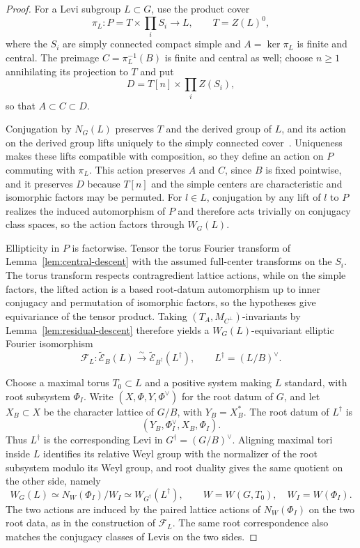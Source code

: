 \documentclass[11pt,a4paper,reqno]{amsart}
\theoremstyle{plain}
\theoremstyle{definition}
\theoremstyle{remark}
\numberwithin{equation}{section}
\newcommand{\wtE}{\widetilde{\mathcal E}}
\begin{document}
\begin{proof}
For a Levi subgroup $L\subset G$, use the product cover
\[
\pi_L\colon P=T\times\prod_i S_i\longrightarrow L,
\qquad T=Z(L)^0,
\]
where the $S_i$ are simply connected compact simple and $A=\ker\pi_L$ is finite and central. The preimage $C=\pi_L^{-1}(B)$ is finite and central as well; choose $n\ge1$ annihilating its projection to $T$ and put
\[
D=T[n]\times\prod_i Z(S_i),
\]
so that $A\subset C\subset D$.

Conjugation by $N_G(L)$ preserves $T$ and the derived group of $L$, and its action on the derived group lifts uniquely to the simply connected cover~\cite[16.10 and~16.21]{Milne}. Uniqueness makes these lifts compatible with composition, so they define an action on $P$ commuting with $\pi_L$. This action preserves $A$ and $C$, since $B$ is fixed pointwise, and it preserves $D$ because $T[n]$ and the simple centers are characteristic and isomorphic factors may be permuted. For $l\in L$, conjugation by any lift of $l$ to $P$ realizes the induced automorphism of $P$ and therefore acts trivially on conjugacy class spaces, so the action factors through $W_G(L)$.

Ellipticity in $P$ is factorwise. Tensor the torus Fourier transform of Lemma~\ref{lem:central-descent} with the assumed full-center transforms on the $S_i$. The torus transform respects contragredient lattice actions, while on the simple factors, the lifted action is a based root-datum automorphism up to inner conjugacy and permutation of isomorphic factors, so the hypotheses give equivariance of the tensor product. Taking $(T_A,M_{C^\perp})$-invariants by Lemma~\ref{lem:residual-descent} therefore yields a $W_G(L)$-equivariant elliptic Fourier isomorphism
\[
\mathcal F_L\colon\wtE_B(L)\xrightarrow{\sim}\wtE_{B^\dagger}(L^\dagger),
\qquad L^\dagger=(L/B)^\vee.
\]

Choose a maximal torus $T_0\subset L$ and a positive system making $L$ standard, with root subsystem $\Phi_I$. Write $(X,\Phi,Y,\Phi^\vee)$ for the root datum of $G$, and let $X_B\subset X$ be the character lattice of $G/B$, with $Y_B=X_B^*$. The root datum of $L^\dagger$ is
\[
(Y_B,\Phi_I^\vee,X_B,\Phi_I).
\]
Thus $L^\dagger$ is the corresponding Levi in $G^\dagger=(G/B)^\vee$. Aligning maximal tori inside $L$ identifies its relative Weyl group with the normalizer of the root subsystem modulo its Weyl group, and root duality gives the same quotient on the other side, namely
\[
W_G(L)\simeq N_W(\Phi_I)/W_I\simeq W_{G^\dagger}(L^\dagger),
\qquad W=W(G,T_0),\quad W_I=W(\Phi_I).
\]
The two actions are induced by the paired lattice actions of $N_W(\Phi_I)$ on the two root data, as in the construction of $\mathcal F_L$. The same root correspondence also matches the conjugacy classes of Levis on the two sides.


\end{proof}
\end{document}
